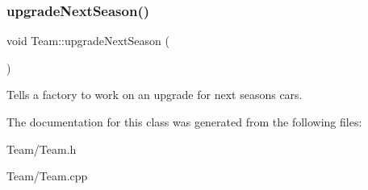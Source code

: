 \subsubsection{\texorpdfstring{upgrade\+Next\+Season()}{upgradeNextSeason()}}
{\footnotesize\ttfamily void Team\+::upgrade\+Next\+Season (\begin{DoxyParamCaption}{ }\end{DoxyParamCaption})}

Tells a factory to work on an upgrade for next season\textquotesingle{}s cars. 

The documentation for this class was generated from the following files\+:\begin{DoxyCompactItemize}
\item 
Team/Team.\+h\item 
Team/Team.\+cpp\end{DoxyCompactItemize}
